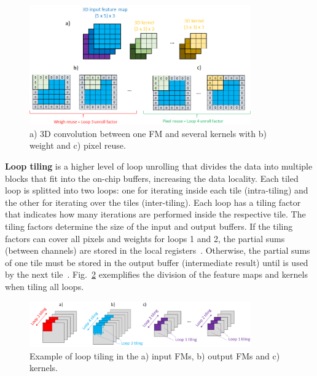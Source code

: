 \vspace{-0.2cm}
\begin{figure}[!htb]
  \centering
  \includegraphics[width=0.85\textwidth]{Figures/unroll_reuse.png}
  \caption{a) 3D convolution between one FM and several kernels with b) weight and c) pixel reuse.}
  \label{fig:unroll_reuse}
\end{figure}

\textbf{Loop tiling} is a higher level of loop unrolling that divides the data into multiple blocks that fit into the on-chip buffers, increasing the data locality. Each tiled loop is splitted into two loops: one for iterating inside each tile (intra-tiling) and the other for iterating over the tiles (inter-tiling). Each loop has a tiling factor that indicates how many iterations are performed inside the respective tile. The tiling factors determine the size of the input and output buffers. If the tiling factors can cover all pixels and weights for loops 1 and 2, the partial sums (between channels) are stored in the local registers~\cite{ma:loop_opt}. Otherwise, the partial sums of one tile must be stored in the output buffer (intermediate result) until is used by the next tile~\cite{ma:loop_opt}. Fig.~\ref{fig:loop_tiling} exemplifies the division of the feature maps and kernels when tiling all loops.

\vspace{-0.2cm}
\begin{figure}[!htb]
  \centering
  \includegraphics[width=0.85\textwidth]{Figures/loop_tiling.png}
  \caption{Example of loop tiling in the a) input FMs, b) output FMs and c) kernels.}
  \label{fig:loop_tiling}
\end{figure}

